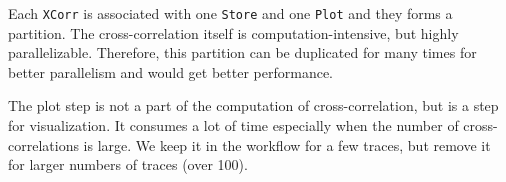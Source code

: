 Each \lstinline|XCorr| is associated with one \lstinline|Store| and one \lstinline|Plot| and they forms a partition. The cross-correlation itself is computation-intensive, but highly parallelizable. Therefore, this partition can be duplicated for many times for better parallelism and would get better performance.

The plot step is not a part of the computation of cross-correlation, but is a step for visualization. It consumes a lot of time especially when the number of cross-correlations is large. We keep it in the workflow for a few traces, but remove it for larger numbers of traces (\eg over 100).
